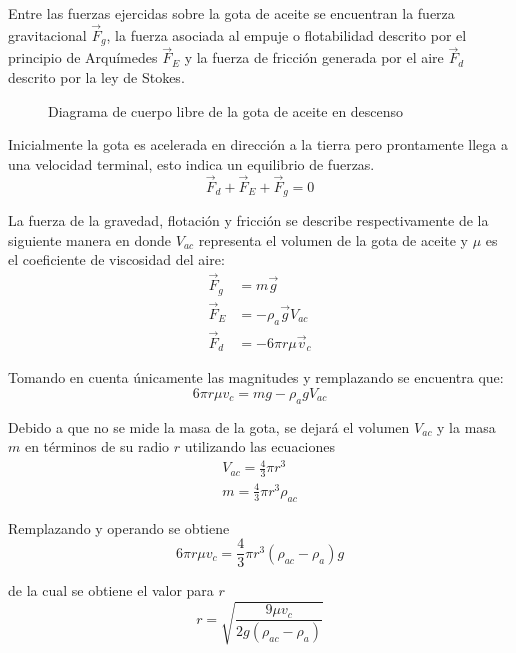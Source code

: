 Entre las fuerzas ejercidas sobre la gota de aceite se encuentran la fuerza
gravitacional $\Vec{F}_g$, la fuerza asociada al empuje o flotabilidad descrito
por el principio de Arquímedes $\Vec{F}_E$ y la fuerza de fricción generada
por el aire $\Vec{F}_d$ descrito por la ley de Stokes.

\begin{figure}[htbp!]
    \centering
    \caption{Diagrama de cuerpo libre de la gota de aceite en descenso}
    \label{fig:fbd-falling-drop}
\end{figure}

Inicialmente la gota es acelerada en dirección a la tierra pero prontamente
llega a una velocidad terminal, esto indica un equilibrio de fuerzas.
\begin{equation}
    \vec{F}_d + \vec{F}_E + \vec{F}_g = 0
\end{equation}

La fuerza de la gravedad, flotación y fricción se describe respectivamente de
la siguiente manera en donde $V_{ac}$ representa el volumen de la gota de
aceite y $\mu$ es el coeficiente de viscosidad del aire:
\begin{align}
    \vec{F}_g &= m\vec{g} \\
    \vec{F}_E &= -\rho_a \vec{g}V_{ac} \\
    \vec{F}_d &= -6\pi r\mu \vec{v}_c
\end{align}

Tomando en cuenta únicamente las magnitudes y remplazando se encuentra que:
\begin{equation}
    6\pi r\mu v_c = mg-\rho_a g V_{ac}
\end{equation}

Debido a que no se mide la masa de la gota, se dejará el volumen $V_{ac}$ y la
masa $m$ en términos de su radio $r$ utilizando las ecuaciones
\begin{align}
    V_{ac} = \frac{4}{3}\pi r^3\\
    m = \frac{4}{3}\pi r^3\rho_{ac}
\end{align}

Remplazando y operando se obtiene
\begin{equation}
    6\pi r\mu v_c = \frac{4}{3}\pi r^3(\rho_{ac}-\rho_a)g
\end{equation}

de la cual se obtiene el valor para $r$
\begin{equation}
    r = \sqrt{\frac{9\mu v_c}{2g(\rho_{ac}-\rho_a)}}
\end{equation}

